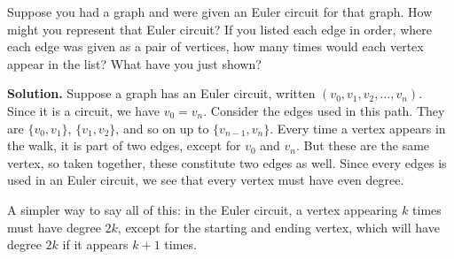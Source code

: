 \documentclass{book}
\begin{document}
\setcounter{project}{17}
\addtocounter{project}{-1}
\begin{activity}[]\label{activity-12}
\hypertarget{p-195}{}%
Suppose you had a graph and were given an Euler circuit for that graph.  How might you represent that Euler circuit?  If you listed each edge in order, where each edge was given as a pair of vertices, how many times would each vertex appear in the list?  What have you just shown?%
\par\smallskip%
\noindent\textbf{Solution.}\hypertarget{solution-12}{}\quad%
\hypertarget{p-196}{}%
Suppose a graph has an Euler circuit, written \((v_0, v_1, v_2, \ldots, v_n)\).  Since it is a circuit, we have \(v_0 = v_n\).  Consider the edges used in this path.  They are \(\{v_0, v_1\}\), \(\{v_1, v_2\}\), and so on up to \(\{v_{n-1}, v_n\}\).  Every time a vertex appears in the walk, it is part of two edges, except for \(v_0\) and \(v_n\).  But these are the same vertex, so taken together, these constitute two edges as well.  Since every edges is used in an Euler circuit, we see that every vertex must have even degree.%
\par
\hypertarget{p-197}{}%
A simpler way to say all of this: in the Euler circuit, a vertex appearing \(k\) times must have degree \(2k\), except for the starting and ending vertex, which will have degree \(2k\) if it appears \(k+1\) times.%
\end{activity}
\end{document}
